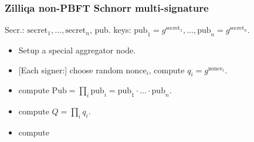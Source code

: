 \begin{frame}
\frametitle{Zilliqa non-PBFT Schnorr multi-signature}
Secr.: $\mathrm{secret}_1, \dots, \mathrm{secret}_n$, pub. keys: $\mathrm{pub}_1 = g^{ \mathrm{secret }_1 }, \dots, \mathrm{pub}_n= g^{\mathrm{secret}_n}$.
\begin{emptyTheorem}
\begin{itemize}
\item<2-> Setup a special aggregator node.
\item {}[Each signer:] choose random $\mathrm{nonce}_i$, compute $q_i = g^{\mathrm{nonce}_i}$.
\item {} compute $\displaystyle \mathrm{Pub} =\prod_{i} \mathrm{pub}_i =\mathrm{pub}_1\cdot \dots \cdot \mathrm{pub}_n$.
\item {} compute $\displaystyle Q = \prod_i q_i$.
\item {} compute 
\end{itemize}
\end{emptyTheorem}
\end{frame}